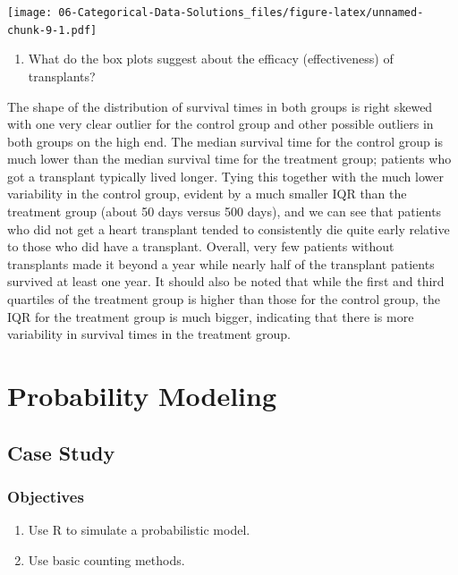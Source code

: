 \documentclass[
]{book}
\providecommand{\tightlist}{%
  \setlength{\itemsep}{0pt}\setlength{\parskip}{0pt}}
\begin{document}
\texttt{[image: 06-Categorical-Data-Solutions\_files/figure-latex/unnamed-chunk-9-1.pdf]}

\begin{enumerate}
\def\labelenumi{\alph{enumi}.}
\setcounter{enumi}{3}
\tightlist
\item
  What do the box plots suggest about the efficacy (effectiveness) of transplants?
\end{enumerate}

The shape of the distribution of survival times in both groups is right skewed with one very clear outlier for the control group and other possible outliers in both groups on the high end. The median survival time for the control group is much lower than the median survival time for the treatment group; patients who got a transplant typically lived longer. Tying this together with the much lower variability in the control group, evident by a much smaller IQR than the treatment group (about 50 days versus 500 days), and we can see that patients who did not get a heart transplant tended to consistently die quite early relative to those who did have a transplant. Overall, very few patients without transplants made it beyond a year while nearly half of the transplant patients survived at least one year. It should also be noted that while the first and third quartiles of the treatment group is higher than those for the control group, the IQR for the treatment group is much bigger, indicating that there is more variability in survival times in the treatment group.

\hypertarget{part-probability-modeling}{%
\part{Probability Modeling}\label{part-probability-modeling}}

\hypertarget{CS2}{%
\chapter{Case Study}\label{CS2}}

\hypertarget{objectives-6}{%
\section{Objectives}\label{objectives-6}}

\begin{enumerate}
\def\labelenumi{\arabic{enumi})}
\tightlist
\item
  Use R to simulate a probabilistic model.\\
\item
  Use basic counting methods.
\end{enumerate}
\end{document}
